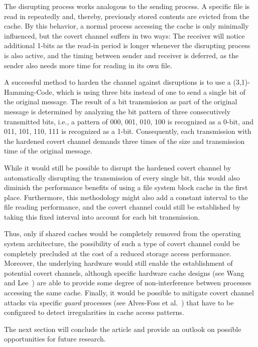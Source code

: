 \documentclass[runningheads,a4paper]{llncs}
\begin{document}
The disrupting process works analogous to the sending process.
A specific file is read in repeatedly and, thereby, previously stored contents are evicted from the cache.
By this behavior, a normal process accessing the cache is only minimally influenced, but the covert channel suffers in two ways: 
The receiver will notice additional 1-bits as the read-in period is longer whenever the disrupting process is also active, and the timing between sender and receiver is deferred, as the sender also needs more time for reading in its own file. 

A successful method to harden the channel against disruptions is to use a (3,1)-Hamming-Code, which is using three bits instead of one to send a single bit of the original message.
The result of a bit transmission as part of the original message is determined by analyzing the bit pattern of three consecutively transmitted bits, i.e., a pattern of 000, 001, 010, 100 is recognized as a 0-bit, and 011, 101, 110, 111 is recognized as a 1-bit.
Consequently, each transmission with the hardened covert channel demands three times of the size and transmission time of the original message.

While it would still be possible to disrupt the hardened covert channel by automatically disrupting the transmission of every single bit, this would also diminish the performance benefits of using a file system block cache in the first place.
Furthermore, this methodology might also add a constant interval to the file reading performance, and the covert channel could still be established by taking this fixed interval into account for each bit transmission.

Thus, only if shared caches would be completely removed from the operating system architecture, the possibility of such a type of covert channel could be completely precluded at the cost of a reduced storage access performance.
Moreover, the underlying hardware would still enable the establishment of potential covert channels, although specific hardware cache designs (see Wang and Lee~\cite{Wang:2007:NCD:1250662.1250723}) are able to provide some degree of non-interference between processes accessing the same cache.
Finally, it would be possible to mitigate covert channel attacks via specific \emph{guard} processes (see Alves-Foss et al.~\cite{alves-foss06themils}) that have to be configured to detect irregularities in cache access patterns.

The next section will conclude the article and provide an outlook on possible opportunities for future research.
\end{document}
